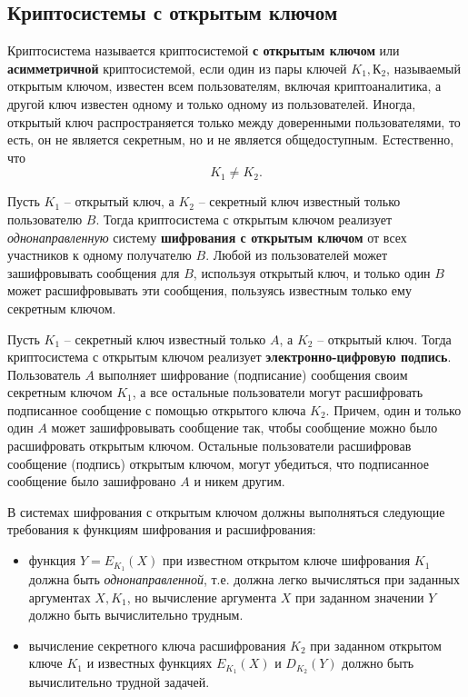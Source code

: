 ﻿%
\subsection{Криптосистемы с открытым ключом}

Криптосистема называется криптосистемой \textbf{с открытым ключом} или \textbf{асимметричной} криптосистемой, если один из пары ключей $K_1, К_2$, называемый открытым ключом, известен всем пользователям, включая криптоаналитика, а другой ключ известен одному и только одному из пользователей. Иногда, открытый ключ распространяется только между доверенными пользователями, то есть, он не является секретным, но и не является общедоступным. Естественно, что
    \[ K_1 \neq K_2. \]

Пусть $K_1$ -- открытый ключ, а $K_2$ -- секретный ключ известный только пользователю $B$. Тогда криптосистема с открытым ключом реализует \emph{однонаправленную} систему \textbf{шифрования с открытым ключом} от всех участников к одному получателю $B$. Любой из пользователей может зашифровывать сообщения для $B$, используя открытый ключ, и только один $B$ может расшифровывать эти сообщения, пользуясь известным только ему секретным ключом.

Пусть $K_1$ -- секретный ключ известный только $A$, а $K_2$ -- открытый ключ. Тогда криптосистема с открытым ключом реализует \textbf{электронно-цифровую подпись}. Пользователь $A$ выполняет шифрование (подписание) сообщения своим секретным ключом $K_1$, а все остальные пользователи могут расшифровать подписанное сообщение с помощью открытого ключа $K_2$. Причем, один и только один $A$ может зашифровывать сообщение так, чтобы сообщение можно было расшифровать открытым ключом. Остальные пользователи расшифровав сообщение (подпись) открытым ключом, могут убедиться, что подписанное сообщение было зашифровано $A$ и никем другим.

В системах шифрования с открытым ключом должны выполняться следующие требования к функциям шифрования и расшифрования:
\begin{itemize}
   \item функция $Y = E_{K_1}(X)$ при известном открытом ключе шифрования $K_1$ должна быть \emph{однонаправленной}, т.е.  должна легко вычисляться при заданных аргументах $X, K_1$, но вычисление аргумента $X$ при заданном значении $Y$ должно быть вычислительно трудным.
   \item вычисление секретного ключа расшифрования $K_2$ при заданном открытом ключе $K_1$ и известных функциях $E_{K_1}(X)$ и $D_{K_2}(Y)$  должно быть вычислительно трудной задачей.
\end{itemize}

